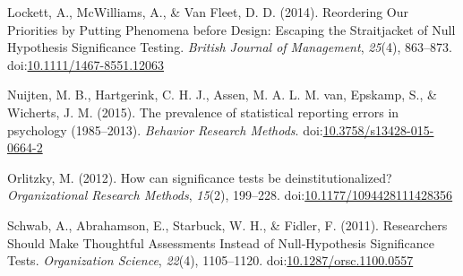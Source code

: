 \documentclass[english,man]{apa6}
\begin{document}
Lockett, A., McWilliams, A., \& {Van Fleet}, D. D. (2014). Reordering
Our Priorities by Putting Phenomena before Design: Escaping the
Straitjacket of Null Hypothesis Significance Testing. \emph{British
Journal of Management}, \emph{25}(4), 863--873.
doi:\href{http://dx.doi.org/10.1111/1467-8551.12063}{10.1111/1467-8551.12063}

Nuijten, M. B., Hartgerink, C. H. J., Assen, M. A. L. M. van, Epskamp,
S., \& Wicherts, J. M. (2015). The prevalence of statistical reporting
errors in psychology (1985--2013). \emph{Behavior Research Methods}.
doi:\href{http://dx.doi.org/10.3758/s13428-015-0664-2}{10.3758/s13428-015-0664-2}

Orlitzky, M. (2012). How can significance tests be deinstitutionalized?
\emph{Organizational Research Methods}, \emph{15}(2), 199--228.
doi:\href{http://dx.doi.org/10.1177/1094428111428356}{10.1177/1094428111428356}

Schwab, A., Abrahamson, E., Starbuck, W. H., \& Fidler, F. (2011).
Researchers Should Make Thoughtful Assessments Instead of
Null-Hypothesis Significance Tests. \emph{Organization Science},
\emph{22}(4), 1105--1120.
doi:\href{http://dx.doi.org/10.1287/orsc.1100.0557}{10.1287/orsc.1100.0557}
\end{document}
